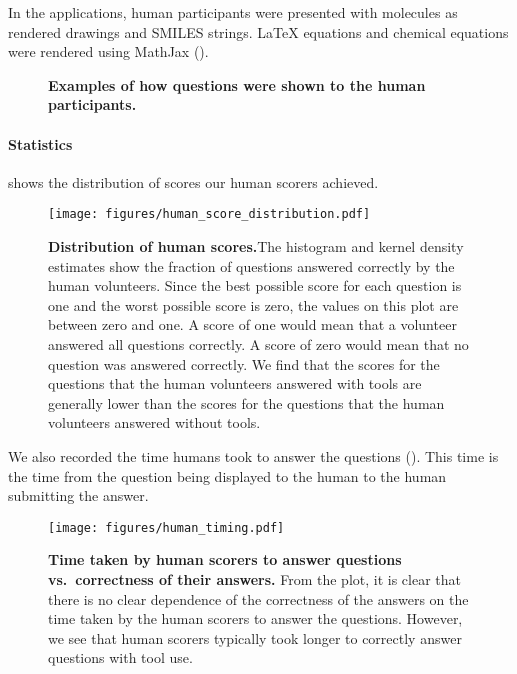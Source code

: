 In the applications, human participants were presented with molecules as rendered drawings and SMILES strings. \LaTeX\xspace equations and chemical equations were rendered using MathJax ().


\begin{figure}

    \caption{\textbf{Examples of how questions were shown to the human participants.}}
    \label{fig:screenshots}
\end{figure}

\paragraph{Statistics}
 shows the distribution of scores our human scorers achieved.

\begin{figure}[htb]
    \centering
    \texttt{[image: figures/human\_score\_distribution.pdf]}
    \caption{\textbf{Distribution of human scores.}The histogram and kernel density estimates show the fraction of questions answered correctly by the human volunteers.
    Since the best possible score for each question is one and the worst possible score is zero, the values on this plot are between zero and one. A score of one would mean that a volunteer answered all questions correctly. A score of zero would mean that no question was answered correctly. 
    We find that the scores for the questions that the human volunteers answered with tools are generally lower than the scores for the questions that the human volunteers answered without tools.}
    \label{fig:human_score_distribution}
\end{figure}

We also recorded the time humans took to answer the questions (). This time is the time from the question being displayed to the human to the human submitting the answer.

\begin{figure}[htb]
    \centering
    \texttt{[image: figures/human\_timing.pdf]}
    \caption{\textbf{Time taken by human scorers to answer questions vs.\ correctness of their answers.} From the plot, it is clear that there is no clear dependence of the correctness of the answers on the time taken by the human scorers to answer the questions. However, we see that human scorers typically took longer to correctly answer questions with tool use.}
    \label{fig:human_timing}
\end{figure}

